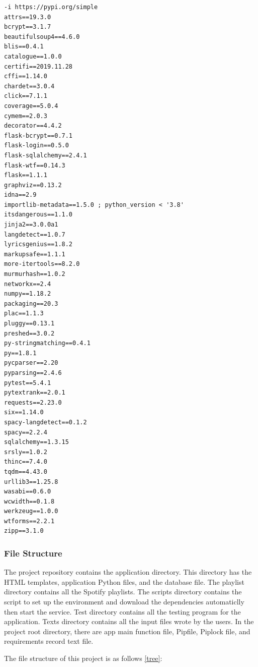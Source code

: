 \begin{lstlisting}[label={lst:req}, caption=requirements.txt]
-i https://pypi.org/simple
attrs==19.3.0
bcrypt==3.1.7
beautifulsoup4==4.6.0
blis==0.4.1
catalogue==1.0.0
certifi==2019.11.28
cffi==1.14.0
chardet==3.0.4
click==7.1.1
coverage==5.0.4
cymem==2.0.3
decorator==4.4.2
flask-bcrypt==0.7.1
flask-login==0.5.0
flask-sqlalchemy==2.4.1
flask-wtf==0.14.3
flask==1.1.1
graphviz==0.13.2
idna==2.9
importlib-metadata==1.5.0 ; python_version < '3.8'
itsdangerous==1.1.0
jinja2==3.0.0a1
langdetect==1.0.7
lyricsgenius==1.8.2
markupsafe==1.1.1
more-itertools==8.2.0
murmurhash==1.0.2
networkx==2.4
numpy==1.18.2
packaging==20.3
plac==1.1.3
pluggy==0.13.1
preshed==3.0.2
py-stringmatching==0.4.1
py==1.8.1
pycparser==2.20
pyparsing==2.4.6
pytest==5.4.1
pytextrank==2.0.1
requests==2.23.0
six==1.14.0
spacy-langdetect==0.1.2
spacy==2.2.4
sqlalchemy==1.3.15
srsly==1.0.2
thinc==7.4.0
tqdm==4.43.0
urllib3==1.25.8
wasabi==0.6.0
wcwidth==0.1.8
werkzeug==1.0.0
wtforms==2.2.1
zipp==3.1.0
\end{lstlisting}

\subsubsection{File Structure}

The project repository contains the application directory. This directory has the
HTML templates, application Python files, and the database file. The playlist
directory contains all the Spotify playlists. The scripts directory contains the
script to set up the environment and download the dependencies automaticlly then
start the service. Test directory contains all the testing program for the application.
Texts directory contains all the input files wrote by the users. In the project
root directory, there are app main function file, Pipfile, Piplock file, and requirements
record text file.

The file structure of this project is as follows \ref{tree}:

